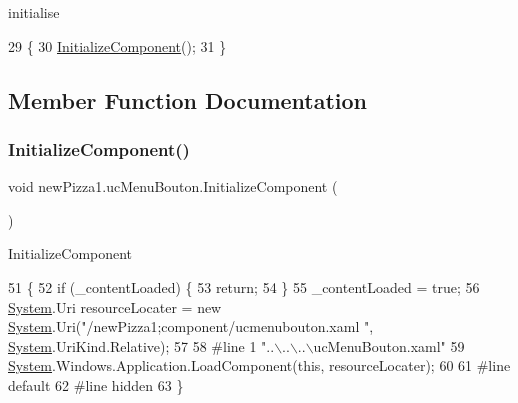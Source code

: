initialise 


\begin{DoxyCode}
29         \{
30             \hyperlink{classnewPizza1_1_1ucMenuBouton_a080790946e454afc7d1441447a1e2313}{InitializeComponent}();
31         \}
\end{DoxyCode}


\subsection{Member Function Documentation}
\mbox{\label{classnewPizza1_1_1ucMenuBouton_a080790946e454afc7d1441447a1e2313}} 
\subsubsection{\texorpdfstring{Initialize\+Component()}{InitializeComponent()}\hspace{0.1cm}{\footnotesize\ttfamily [1/6]}}
{\footnotesize\ttfamily void new\+Pizza1.\+uc\+Menu\+Bouton.\+Initialize\+Component (\begin{DoxyParamCaption}{ }\end{DoxyParamCaption})\hspace{0.3cm}{\ttfamily [inline]}}



Initialize\+Component 


\begin{DoxyCode}
51                                           \{
52             \textcolor{keywordflow}{if} (\_contentLoaded) \{
53                 \textcolor{keywordflow}{return};
54             \}
55             \_contentLoaded = \textcolor{keyword}{true};
56             \hyperlink{namespaceSystem}{System}.Uri resourceLocater = \textcolor{keyword}{new} \hyperlink{namespaceSystem}{System}.Uri(\textcolor{stringliteral}{"/newPizza1;component/ucmenubouton.xaml
      "}, \hyperlink{namespaceSystem}{System}.UriKind.Relative);
57             
58 \textcolor{preprocessor}{            #line 1 "..\(\backslash\)..\(\backslash\)..\(\backslash\)ucMenuBouton.xaml"}
59             \hyperlink{namespaceSystem}{System}.Windows.Application.LoadComponent(\textcolor{keyword}{this}, resourceLocater);
60             
61 \textcolor{preprocessor}{            #line default}
62 \textcolor{preprocessor}{            #line hidden}
63         \}
\end{DoxyCode}
\mbox{\label{classnewPizza1_1_1ucMenuBouton_a080790946e454afc7d1441447a1e2313}} 
